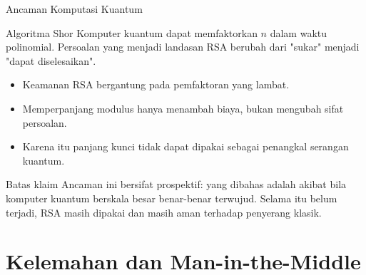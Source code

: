 \documentclass[aspectratio=169,11pt]{beamer}
\begin{document}
\begin{frame}{Ancaman Komputasi Kuantum}
    \footnotesize
    \begin{block}{Algoritma Shor}
        Komputer kuantum dapat memfaktorkan $n$ dalam waktu polinomial.
        Persoalan yang menjadi landasan RSA berubah dari "sukar" menjadi
        "dapat diselesaikan".
    \end{block}
    \vspace{0.1cm}
    \begin{itemize}
        \item Keamanan RSA bergantung pada pemfaktoran yang lambat.
        \item Memperpanjang modulus hanya menambah biaya, bukan mengubah
              sifat persoalan.
        \item Karena itu panjang kunci tidak dapat dipakai sebagai penangkal
              serangan kuantum.
    \end{itemize}
    \begin{alertblock}{Batas klaim}
        \footnotesize
        Ancaman ini bersifat prospektif: yang dibahas adalah akibat bila
        komputer kuantum berskala besar benar-benar terwujud. Selama itu
        belum terjadi, RSA masih dipakai dan masih aman terhadap penyerang
        klasik.
    \end{alertblock}
\end{frame}

\section{Kelemahan dan Man-in-the-Middle}
\end{document}
